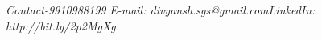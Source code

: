 \documentclass[11pt]{article}
\begin{document}
\textit{Contact-9910988199}                                                 \hspace{2.5cm}\textit{E-mail: divyansh.sgs@gmail.com}\hspace{2.5cm}\textit{LinkedIn: http://bit.ly/2p2MgXg}                           
\begin{mdframed}[backgroundcolor=orange]

~

\begin{flushright}

\begin{Huge}


\end{Huge}

\end{flushright}
\end{mdframed}
\end{document}
